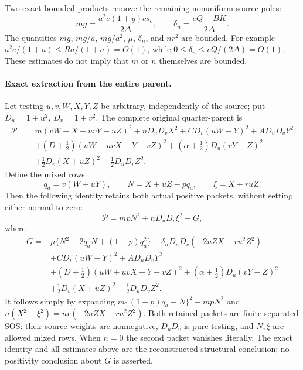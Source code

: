 Two exact bounded products remove the remaining nonuniform source
poles:
\[
 mg=\frac{a^2e(1+y)c s_c}{2\Delta},\qquad
 \delta_n=\frac{eQ-BK}{2\Delta}.                       \tag{RER7}
\]
The quantities $mg$, $mg/a$, $mg/a^2$, $\mu$, $\delta_n$, and
$nr^2$ are bounded.  For example
$a^2e/(1+a)\leq R a/(1+a)=O(1)$, while
$0\leq\delta_n\leq eQ/(2\Delta)=O(1)$.
These estimates do not imply that $m$ or $n$ themselves are bounded.

\paragraph{Exact extraction from the entire parent.}
Let testing $u,v,W,X,Y,Z$ be arbitrary, independently of the source;
put $D_u=1+u^2$, $D_v=1+v^2$.  The complete original quarter-parent is
\begin{align*}
 \mathcal P={}&m(vW-X+uvY-uZ)^2+nD_uD_vX^2
     +CD_v(uW-Y)^2+AD_uD_vY^2\\
 &+(D+\tfrac12)(uW+uvX-Y-vZ)^2
     +(\alpha+\tfrac12)D_u(vY-Z)^2\\
 &+\tfrac12D_v(X+uZ)^2-\tfrac12D_uD_vZ^2.
\end{align*}
Define the mixed rows
\[
 q_a=v(W+uY),\qquad N=X+uZ-pq_a,\qquad \xi=X+ruZ.
\]
Then the following identity retains both actual positive packets,
without setting either normal to zero:
\[
 \mathcal P=mpN^2+nD_uD_v\xi^2+G,                       \tag{RER8}
\]
where
\begin{align*}
 G={}&\mu\{N^2-2q_aN+(1-p)q_a^2\}
        +\delta_nD_uD_v(-2uZX-ru^2Z^2)\\
 &+CD_v(uW-Y)^2+AD_uD_vY^2\\
 &+(D+\tfrac12)(uW+uvX-Y-vZ)^2
        +(\alpha+\tfrac12)D_u(vY-Z)^2\\
 &+\tfrac12D_v(X+uZ)^2-\tfrac12D_uD_vZ^2.
\end{align*}
It follows simply by expanding
$m\{(1-p)q_a-N\}^2-mpN^2$ and
$n(X^2-\xi^2)=nr(-2uZX-ru^2Z^2)$.
Both retained packets are finite separated SOS: their source weights
are nonnegative, $D_uD_v$ is pure testing, and $N,\xi$ are allowed
mixed rows.  When $n=0$ the second packet vanishes literally.
The exact identity and all estimates above are the reconstructed
structural conclusion; no positivity conclusion about $G$ is asserted.
